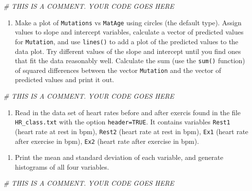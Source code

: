 \documentclass[
]{book}
\newenvironment{Shaded}{\begin{snugshade}}{\end{snugshade}}
\newcommand{\CommentTok}[1]{\textcolor[rgb]{0.56,0.35,0.01}{\textit{#1}}}
\providecommand{\tightlist}{%
  \setlength{\itemsep}{0pt}\setlength{\parskip}{0pt}}
\theoremstyle{definition}
\theoremstyle{definition}
\theoremstyle{definition}
\theoremstyle{remark}
\begin{document}
\begin{Shaded}
\begin{Highlighting}[]
\CommentTok{\# THIS IS A COMMENT. YOUR CODE GOES HERE }
\end{Highlighting}
\end{Shaded}

\begin{enumerate}
\def\labelenumi{\alph{enumi})}
\setcounter{enumi}{2}
\tightlist
\item
  Make a plot of \texttt{Mutations} vs \texttt{MatAge} using circles (the default type). Assign values to slope and intercept variables, calculate a vector of predicted values for \texttt{Mutation}, and use \texttt{lines()} to add a plot of the predicted values to the data plot. Try different values of the slope and intercept until you find ones that fit the data reasonably well. Calculate the sum (use the \texttt{sum()} function) of squared differences between the vector \texttt{Mutation} and the vector of predicted values and print it out.
\end{enumerate}

\begin{Shaded}
\begin{Highlighting}[]
\CommentTok{\# THIS IS A COMMENT. YOUR CODE GOES HERE }
\end{Highlighting}
\end{Shaded}

\begin{enumerate}
\def\labelenumi{\arabic{enumi}.}
\setcounter{enumi}{1}
\tightlist
\item
  Read in the data set of heart rates before and after exercis found in the file \texttt{HR\_class.txt} with the option \texttt{header=TRUE}. It contains variables \texttt{Rest1} (heart rate at rest in bpm), \texttt{Rest2} (heart rate at rest in bpm), \texttt{Ex1} (heart rate after exercise in bpm), \texttt{Ex2} (heart rate after exercise in bpm).
\end{enumerate}

\begin{enumerate}
\def\labelenumi{\alph{enumi})}
\tightlist
\item
  Print the mean and standard deviation of each variable, and generate histograms of all four variables.
\end{enumerate}

\begin{Shaded}
\begin{Highlighting}[]
\CommentTok{\# THIS IS A COMMENT. YOUR CODE GOES HERE }
\end{Highlighting}
\end{Shaded}
\end{document}
